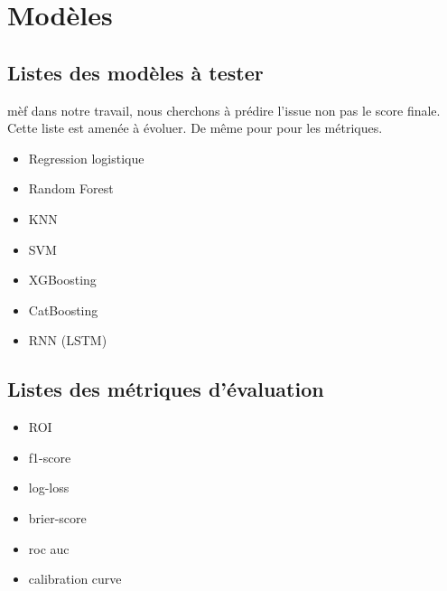 \documentclass[11pt, a4paper]{report}
\begin{document}
% 

% 

% 

\chapter{Modèles}
\section{Listes des modèles à tester}
mèf dans notre travail, nous cherchons à prédire l'issue non 
pas le score finale. Cette liste est amenée à évoluer. 
De même pour pour les métriques.
\begin{itemize}
    \item Regression logistique
    \item Random Forest
    \item KNN
    \item SVM
    \item XGBoosting
    \item CatBoosting
    \item RNN (LSTM)
\end{itemize}
\section{Listes des métriques d'évaluation}


\begin{itemize}
    \item ROI
    \item f1-score
    \item log-loss
    \item brier-score
    \item roc auc 
    \item calibration curve
\end{itemize}

\newpage
\nocite{*}


\end{document}
